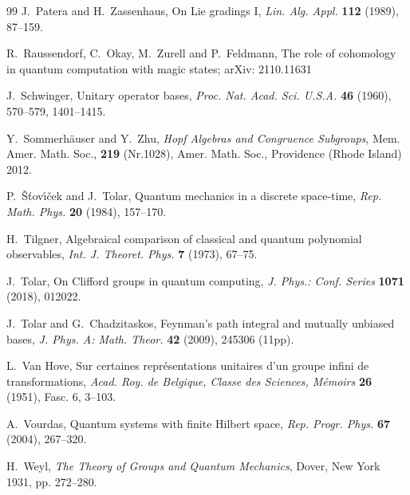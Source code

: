 \documentclass[10pt]{amsart}
\theoremstyle{plain}
\theoremstyle{definition}
\theoremstyle{remark}%
\begin{document}
\begin{thebibliography}{99}
J.~Patera and H.~Zassenhaus, On Lie gradings I,
\textit{Lin. Alg. Appl.} \textbf{112} (1989), 87--159.




	
R.~Raussendorf, C.~Okay, M.~Zurell and P.~Feldmann,
The role of cohomology in quantum computation with magic states;
arXiv: 2110.11631



J.~Schwinger, Unitary operator bases, {\it Proc. Nat. Acad. Sci. U.S.A.} {\bf 46} (1960), 570--579, 1401--1415.
	
	
Y.~Sommerh\"{a}user and Y.~Zhu, 
\textit{Hopf Algebras and Congruence Subgroups}, 
Mem. Amer. Math. Soc.,  \textbf{219} (Nr.1028),
Amer. Math. Soc., Providence (Rhode Island) 2012.



	
	
P.~\v{S}\v{t}ov\'{\i}\v{c}ek and J.~Tolar,    Quantum mechanics in a
discrete space-time, {\em Rep. Math. Phys.} {\bf 20} (1984), 157--170.

H.~Tilgner, Algebraical comparison of classical and quantum
polynomial observables, 
\textit{Int. J. Theoret. Phys.} \textbf{7} (1973), 67--75.


J.~Tolar, On Clifford groups in quantum computing,
\textit{J. Phys.: Conf. Series} \textbf{1071} (2018), 012022. 


J.~Tolar and G.~Chadzitaskos, Feynman's path integral and mutually unbiased bases, 
\textit{J. Phys. A: Math. Theor.} \textbf{42} (2009), 245306 (11pp).


	
L.~Van Hove, Sur certaines repr\'esentations unitaires d'un groupe
infini de transformations,
\textit{Acad. Roy. de Belgique, Classe des Sciences, M\'emoirs}
\textbf{26} (1951), Fasc. 6, 3--103.


A.~Vourdas, 
Quantum systems with finite Hilbert space, 
\textit{Rep. Progr. Phys.} {\bf 67} (2004), 267--320.

H.~Weyl, {\it The Theory of Groups and Quantum Mechanics}, 
Dover, New York 1931, pp. 272--280.
	
		



\end{thebibliography}
\end{document}
